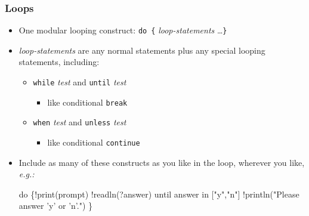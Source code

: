 \documentclass[12pt]{beamer}
\begin{document}
\begin{frame}[fragile]
\frametitle{Loops}
\begin{itemize}
\item One modular looping construct:
  \texttt{do \{} \emph{loop-statements} \ldots \texttt{\}}
\item \emph{loop-statements} are any normal statements plus any
  special looping statements, including:
  \begin{itemize}
  \item \texttt{while} \emph{test} and \texttt{until} \emph{test}
    \begin{itemize}
    \item like conditional \texttt{break}
    \end{itemize}
  \item \texttt{when} \emph{test} and \texttt{unless} \emph{test}
    \begin{itemize}
    \item like conditional \texttt{continue}
    \end{itemize}
  \end{itemize}
\item Include as many of these constructs as you like in the loop,
  wherever you like, \emph{e.g.:} \\
\begin{semiverbatim}
    do \{!print(prompt)
        !readln(?answer)
        until answer in ["y","n"]
        !println("Please answer 'y' or 'n'.")
    \}
\end{semiverbatim}
\end{itemize}
\end{frame}
\end{document}
